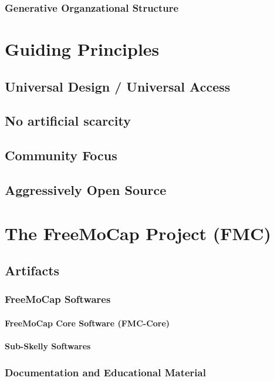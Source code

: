 \documentclass[11pt]{article}
\begin{document}
\subsubsection{Generative Organzational Structure}


\section{Guiding Principles}
\subsection{Universal Design / Universal Access}
\subsection{No artificial scarcity}
\subsection{Community Focus}
\subsection{Aggressively Open Source}


\section{The FreeMoCap Project (FMC)}

\subsection{Artifacts}

\subsubsection{FreeMoCap Softwares}
\paragraph{FreeMoCap Core Software (FMC-Core)}
\paragraph{Sub-Skelly Softwares}

\subsubsection{Documentation and Educational Material}
\end{document}

